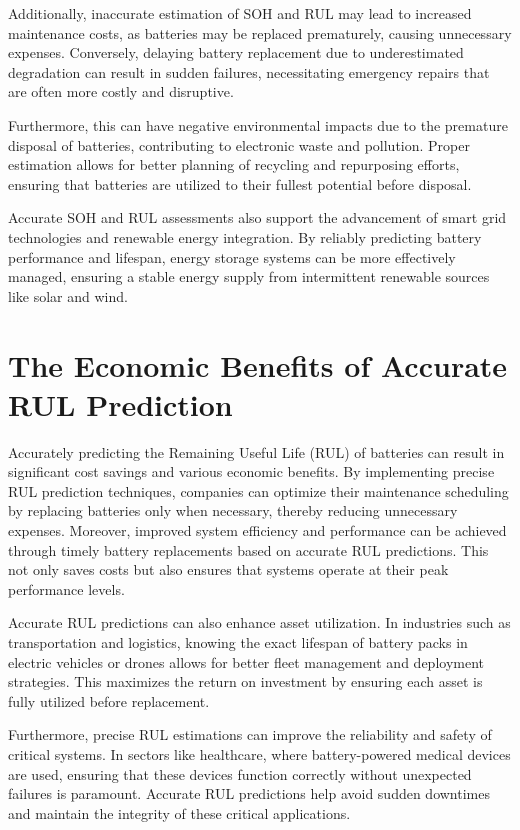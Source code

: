 Additionally, inaccurate estimation of SOH and RUL may lead to increased maintenance costs, as batteries may be replaced prematurely, causing unnecessary expenses. Conversely, delaying battery replacement due to underestimated degradation can result in sudden failures, necessitating emergency repairs that are often more costly and disruptive.

Furthermore, this can have negative environmental impacts due to the premature disposal of batteries, contributing to electronic waste and pollution. Proper estimation allows for better planning of recycling and repurposing efforts, ensuring that batteries are utilized to their fullest potential before disposal.

Accurate SOH and RUL assessments also support the advancement of smart grid technologies and renewable energy integration. By reliably predicting battery performance and lifespan, energy storage systems can be more effectively managed, ensuring a stable energy supply from intermittent renewable sources like solar and wind.

\section{The Economic Benefits of Accurate RUL Prediction}
Accurately predicting the Remaining Useful Life (RUL) of batteries can result in significant cost savings and various economic benefits. By implementing precise RUL prediction techniques, companies can optimize their maintenance scheduling by replacing batteries only when necessary, thereby reducing unnecessary expenses. Moreover, improved system efficiency and performance can be achieved through timely battery replacements based on accurate RUL predictions. This not only saves costs but also ensures that systems operate at their peak performance levels.

Accurate RUL predictions can also enhance asset utilization. In industries such as transportation and logistics, knowing the exact lifespan of battery packs in electric vehicles or drones allows for better fleet management and deployment strategies. This maximizes the return on investment by ensuring each asset is fully utilized before replacement.

Furthermore, precise RUL estimations can improve the reliability and safety of critical systems. In sectors like healthcare, where battery-powered medical devices are used, ensuring that these devices function correctly without unexpected failures is paramount. Accurate RUL predictions help avoid sudden downtimes and maintain the integrity of these critical applications.

